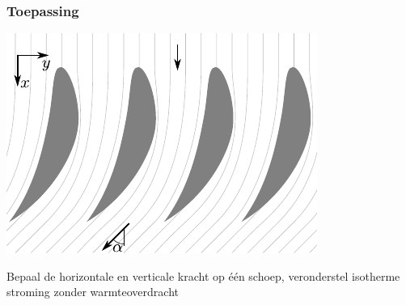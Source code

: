 \documentclass[t]{beamer}
\begin{document}
	\begin{frame}
		\frametitle{Toepassing}
		\vspace{1cm}
		\centering
		\includegraphics{../fig/controlevolumes/Schoepenrij_zonder_controlevolume}
		
		Bepaal de horizontale en verticale kracht op één schoep, veronderstel isotherme stroming zonder warmteoverdracht
	\end{frame}
\end{document}
